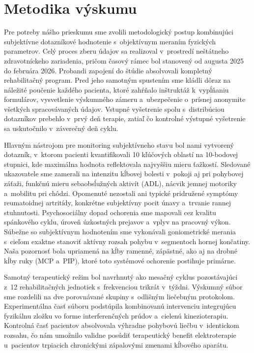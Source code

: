 \clearpage
\clearpage
\section{Metodika výskumu}

Pre potreby nášho prieskumu sme zvolili metodologický postup kombinujúci subjektívne dotazníkové hodnotenie s~objektívnym meraním fyzických parametrov. Celý proces zberu údajov sa realizoval v~prostredí neštátneho zdravotníckeho zariadenia, pričom časový rámec bol stanovený od augusta 2025 do februára 2026. Probandi zapojení do štúdie absolvovali kompletný rehabilitačný program. Pred jeho samotným spustením sme kládli dôraz na náležité poučenie každého pacienta, ktoré zahŕňalo inštruktáž k~vypĺňaniu formulárov, vysvetlenie výskumného zámeru a~ubezpečenie o~prísnej anonymite všetkých spracovávaných údajov. Vstupné vyšetrenie spolu s~distribúciou dotazníkov prebehlo v~prvý deň terapie, zatiaľ čo kontrolné výstupné vyšetrenie sa uskutočnilo v~záverečný deň cyklu.

Hlavným nástrojom pre monitoring subjektívneho stavu bol nami vytvorený dotazník, v~ktorom pacienti kvantifikovali 10 kľúčových oblastí na 10-bodovej stupnici, kde maximálna hodnota reflektovala najvyššiu mieru ťažkostí. Sledované ukazovatele sme zamerali na intenzitu kĺbovej bolesti v~pokoji aj pri pohybovej záťaži, funkčnú mieru sebaobsĺužných aktivít (ADL), nácvik jemnej motoriky a~mobilitu pri chôdzi. Opomenuté nezostali ani typické pridružené symptómy reumatoidnej artritídy, konkrétne subjektívny pocit únavy a~trvanie rannej stuhnutosti. Psychosociálny dopad ochorenia sme mapovali cez kvalitu spánkového cyklu, úroveň úzkostných prejavov a~vplyv na pracovný výkon. Súbežne so subjektívnym hodnotením sme vykonávali goniometrické merania s~cieľom exaktne stanoviť aktívny rozsah pohybu v~segmentoch hornej končatiny. Naša pozornosť bola upriamená na kĺby ramenné, zápästné, ako aj na drobné kĺby ruky (MCP a~PIP), ktoré toto systémové ochorenie postihuje primárne.

Samotný terapeutický režim bol navrhnutý ako mesačný cyklus pozostávajúci z~12 rehabilitačných jednotiek s~frekvenciou trikrát v~týždni. Výskumný súbor sme rozdelili na dve porovnávané skupiny s~odlišným liečebným protokolom. Experimentálna časť súboru podstúpila kombinovanú intervenciu integrujúcu fyzikálnu zložku vo forme interferenčných prúdov a~cielenú kinezioterapiu. Kontrolná časť pacientov absolvovala výhradne pohybovú liečbu v~identickom rozsahu, čo nám umožnilo validne posúdiť terapeutický benefit elektroterapie u~pacientov trpiacich chronickými zápalovými zmenami kĺbového aparátu.

